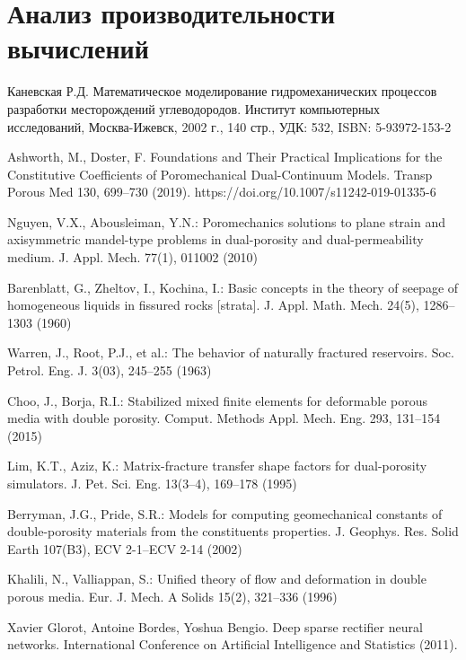\documentclass[14pt]{article}
\begin{document}
\section{Анализ производительности вычислений}

\newpage


\begin{thebibliography}{10}

	 Каневская Р.Д. Математическое моделирование гидромеханических процессов разработки месторождений углеводородов. Институт компьютерных исследований, Москва-Ижевск, 2002 г., 140 стр., УДК: 532, ISBN: 5-93972-153-2

	 Ashworth, M., Doster, F. Foundations and Their Practical Implications for the Constitutive Coefficients of Poromechanical Dual-Continuum Models. Transp Porous Med 130, 699–730 (2019). https://doi.org/10.1007/s11242-019-01335-6	
	
	 Nguyen, V.X., Abousleiman, Y.N.: Poromechanics solutions to plane strain and axisymmetric mandel-type problems in dual-porosity and dual-permeability medium. J. Appl. Mech. 77(1), 011002 (2010)

	 Barenblatt, G., Zheltov, I., Kochina, I.: Basic concepts in the theory of seepage of homogeneous liquids in
fissured rocks [strata]. J. Appl. Math. Mech. 24(5), 1286–1303 (1960)	
	
	 Warren, J., Root, P.J., et al.: The behavior of naturally fractured reservoirs. Soc. Petrol. Eng. J. 3(03), 245–255 (1963)
		
	 Choo, J., Borja, R.I.: Stabilized mixed finite elements for deformable porous media with double porosity.
Comput. Methods Appl. Mech. Eng. 293, 131–154 (2015)

	 Lim, K.T., Aziz, K.: Matrix-fracture transfer shape factors for dual-porosity simulators. J. Pet. Sci. Eng. 13(3–4), 169–178 (1995)
		
	 Berryman, J.G., Pride, S.R.: Models for computing geomechanical constants of double-porosity materials from the constituents properties. J. Geophys. Res. Solid Earth 107(B3), ECV 2-1–ECV 2-14 (2002)
	
	 Khalili, N., Valliappan, S.: Unified theory of flow and deformation in double porous media. Eur. J. Mech. A Solids 15(2), 321–336 (1996)
	
	  Xavier Glorot, Antoine Bordes, Yoshua Bengio. Deep sparse rectifier neural networks. International Conference on Artificial Intelligence and Statistics (2011).
	
\end{thebibliography}
\end{document}
